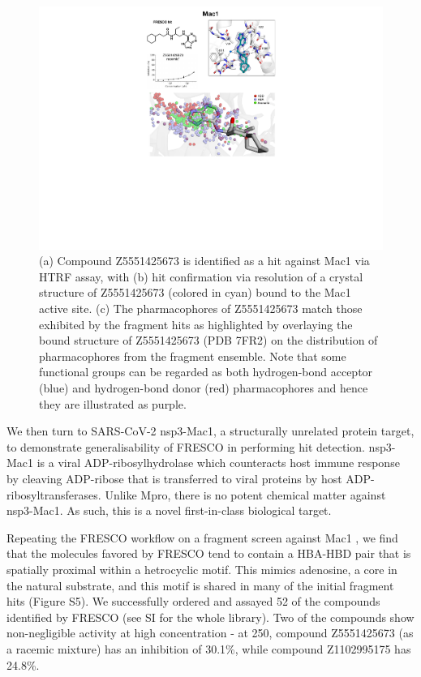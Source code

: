 \begin{figure}
    \centering
    \includegraphics[width=0.75\linewidth]{Chapters/Fresco/Figs/mac1_fig.pdf}
    \caption{(a) Compound Z5551425673 is identified as a hit against Mac1 via HTRF assay, with (b) hit confirmation via resolution of a crystal structure of Z5551425673 (colored in cyan) bound to the Mac1 active site. (c) The pharmacophores of Z5551425673 match those exhibited by the fragment hits as highlighted by overlaying the bound structure of Z5551425673 (PDB 7FR2) on the distribution of pharmacophores from the fragment ensemble. Note that some functional groups can be regarded as both hydrogen-bond acceptor (blue) and hydrogen-bond donor (red) pharmacophores and hence they are illustrated as purple.}
    \label{fig:mac1_hit}
\end{figure}

We then turn to SARS-CoV-2 nsp3-Mac1, a structurally unrelated protein target, to demonstrate generalisability of FRESCO in performing hit detection. nsp3-Mac1 is a viral ADP-ribosylhydrolase which counteracts host immune response by cleaving ADP-ribose that is transferred to viral proteins by host ADP-ribosyltransferases. Unlike Mpro, there is no potent chemical matter against nsp3-Mac1. As such, this is a novel first-in-class biological target. 

Repeating the FRESCO workflow on a fragment screen against Mac1 \cite{Schuller2021Mac1Frag}, we find that the molecules favored by FRESCO tend to contain a HBA-HBD pair that is spatially proximal within a hetrocyclic motif. This mimics adenosine, a core in the natural substrate, and this motif is shared in many of the initial fragment hits (Figure S5). We successfully ordered and assayed 52 of the compounds identified by FRESCO (see SI for the whole library).  Two of the compounds show non-negligible activity at high concentration - at 250\uM, compound Z5551425673 (as a racemic mixture) has an inhibition of 30.1\%, while compound Z1102995175 has 24.8\%.

